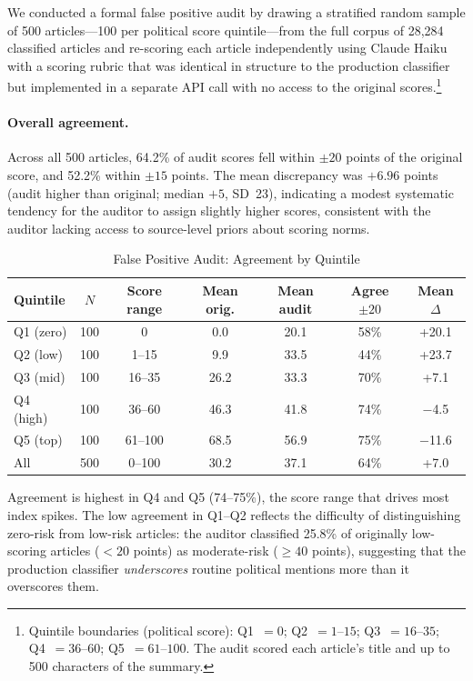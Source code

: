\documentclass[12pt,a4paper]{article}
\begin{document}
We conducted a formal false positive audit by drawing a stratified random
sample of 500 articles---100 per political score quintile---from the full
corpus of 28,284 classified articles and re-scoring each article
independently using Claude Haiku with a scoring rubric that was identical
in structure to the production classifier but implemented in a separate
API call with no access to the original scores.\footnote{Quintile boundaries
(political score): Q1~$= 0$; Q2~$= 1$--$15$; Q3~$= 16$--$35$;
Q4~$= 36$--$60$; Q5~$= 61$--$100$.  The audit scored each article's title
and up to 500 characters of the summary.}

\paragraph{Overall agreement.}
Across all 500 articles, 64.2\% of audit scores fell within $\pm 20$ points
of the original score, and 52.2\% within $\pm 15$ points.  The mean
discrepancy was $+6.96$ points (audit higher than original; median $+5$,
SD~23), indicating a modest systematic tendency for the auditor to assign
slightly higher scores, consistent with the auditor lacking access to
source-level priors about scoring norms.

\begin{table}[h]
\centering
\small
\caption{False Positive Audit: Agreement by Quintile}
\label{tab:fp_audit}
\begin{tabular}{lcccccc}
\toprule
Quintile & $N$ & Score range & Mean orig. & Mean audit & Agree $\pm 20$ & Mean $\Delta$ \\
\midrule
Q1 (zero) & 100 & 0       & 0.0  & 20.1 & 58\% & +20.1 \\
Q2 (low)  & 100 & 1--15   & 9.9  & 33.5 & 44\% & +23.7 \\
Q3 (mid)  & 100 & 16--35  & 26.2 & 33.3 & 70\% & +7.1  \\
Q4 (high) & 100 & 36--60  & 46.3 & 41.8 & 74\% & $-$4.5 \\
Q5 (top)  & 100 & 61--100 & 68.5 & 56.9 & 75\% & $-$11.6 \\
\midrule
All       & 500 & 0--100  & 30.2 & 37.1 & 64\% & +7.0  \\
\bottomrule
\end{tabular}
\end{table}

Agreement is highest in Q4 and Q5 (74--75\%), the score range that drives
most index spikes.  The low agreement in Q1--Q2 reflects the difficulty of
distinguishing zero-risk from low-risk articles: the auditor classified 25.8\%
of originally low-scoring articles ($< 20$ points) as moderate-risk ($\geq 40$
points), suggesting that the production classifier \emph{underscores} routine
political mentions more than it overscores them.
\end{document}

